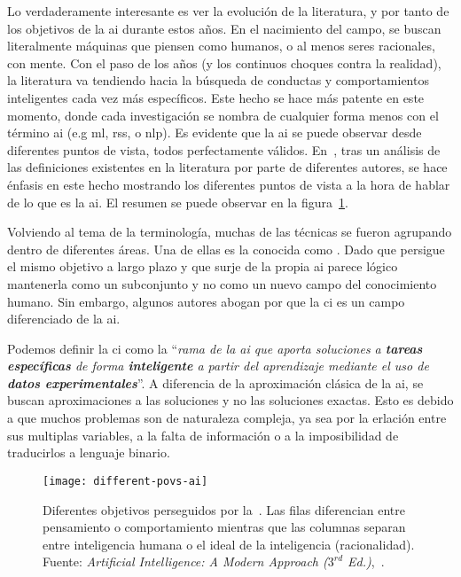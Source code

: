 Lo verdaderamente interesante es ver la evolución de la literatura, y por tanto de los objetivos de la \ac{ai} durante estos años. En el nacimiento del campo, se buscan literalmente máquinas que piensen como humanos, o al menos seres racionales, con mente. Con el paso de los años (y los continuos choques contra la realidad), la literatura va tendiendo hacia la búsqueda de conductas y comportamientos inteligentes cada vez más específicos. Este hecho se hace más patente en este momento, donde cada investigación se nombra de cualquier forma menos con el término \ac{ai} (e.g \ac{ml}, \acp{rs}, o \ac{nlp}). Es evidente que la \ac{ai} se puede observar desde diferentes puntos de vista, todos perfectamente válidos. En~\cite{russell2003artificial}, tras un análisis de las definiciones existentes en la literatura por parte de diferentes autores, se hace énfasis en este hecho mostrando los diferentes puntos de vista a la hora de hablar de lo que es la \ac{ai}. El resumen se puede observar en la figura~\ref{fig:different-povs-ai}.

Volviendo al tema de la terminología, muchas de las técnicas se fueron agrupando dentro de diferentes áreas. Una de ellas es la conocida como . Dado que persigue el mismo objetivo a largo plazo y que surje de la propia \ac{ai} parece lógico mantenerla como un subconjunto y no como un nuevo campo del conocimiento humano. Sin embargo, algunos autores abogan por que la \ac{ci} es un campo diferenciado de la \ac{ai}.

Podemos definir la \ac{ci} como la \enquote{\textit{rama de la \ac{ai} que aporta soluciones a \textbf{tareas específicas} de forma \textbf{inteligente} a partir del aprendizaje mediante el uso de \textbf{datos experimentales}}}. A diferencia de la aproximación clásica de la \ac{ai}, se buscan aproximaciones a las soluciones y no las soluciones exactas. Esto es debido a que muchos problemas son de naturaleza compleja, ya sea por la erlación entre sus multiplas variables, a la falta de información o a la imposibilidad de traducirlos a lenguaje binario.

\begin{figure}
	\texttt{[image: different-povs-ai]}
	\caption[Diferentes objetivos perseguidos por la ]{Diferentes objetivos perseguidos por la~. Las filas diferencian entre pensamiento o comportamiento mientras que las columnas separan entre inteligencia humana o el ideal de la inteligencia (racionalidad). Fuente: \textit{Artificial Intelligence: A Modern Approach ($3^{rd}$ Ed.)},~\cite{russell2003artificial}.}
	\label{fig:different-povs-ai}
\end{figure}


